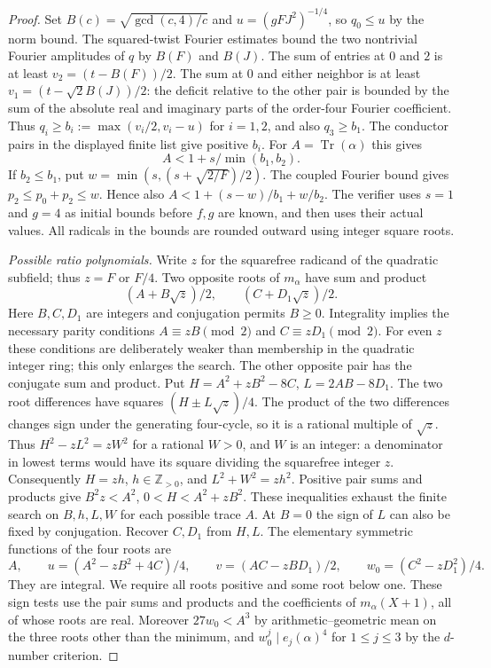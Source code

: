 \documentclass[11pt,a4paper]{article}
\numberwithin{equation}{section}
\begin{document}
\begin{proof}
Set $B(c)=\sqrt{\gcd(c,4)/c}$ and
$u=(gFJ^2)^{-1/4}$, so $q_0\le u$ by the norm bound.
The squared-twist Fourier estimates bound the two nontrivial Fourier
amplitudes of $q$ by $B(F)$ and $B(J)$.
The sum of entries at $0$ and $2$ is at least
$v_2=(t-B(F))/2$. The sum at $0$ and either neighbor is at least
$v_1=(t-\sqrt{2}B(J))/2$: the deficit relative to the other pair is
bounded by the sum of the absolute real and imaginary parts of the
order-four Fourier coefficient. Thus
$q_i\ge b_i:=\max(v_i/2,v_i-u)$ for $i=1,2$, and also $q_3\ge b_1$.
The conductor pairs in the displayed finite list give positive $b_i$.
For $A=\operatorname{Tr}(\alpha)$ this gives
\[
 A<1+s/\min(b_1,b_2).
\]
If $b_2\le b_1$, put $w=\min(s,(s+\sqrt{2/F})/2)$.
The coupled Fourier bound gives $p_2\le p_0+p_2\le w$.
Hence also $A<1+(s-w)/b_1+w/b_2$.
The verifier uses $s=1$ and $g=4$ as initial bounds before $f,g$ are
known, and then uses their actual values. All radicals in the bounds
are rounded outward using integer square roots.

\medskip\noindent\emph{Possible ratio polynomials.}
Write $z$ for the squarefree radicand of the quadratic subfield; thus
$z=F$ or $F/4$. Two opposite roots of $m_\alpha$ have sum and product
\[
 (A+B\sqrt z)/2,\qquad (C+D_1\sqrt z)/2.
\]
Here $B,C,D_1$ are integers and conjugation permits $B\ge0$.
Integrality implies the necessary parity conditions
$A\equiv zB\pmod2$ and $C\equiv zD_1\pmod2$.
For even $z$ these conditions are deliberately weaker than membership
in the quadratic integer ring; this only enlarges the search.
The other opposite pair has the conjugate sum and product.
Put $H=A^2+zB^2-8C$, $L=2AB-8D_1$. The two root differences have
squares $(H\pm L\sqrt z)/4$. The product of the two differences changes
sign under the generating four-cycle, so it is a rational multiple of
$\sqrt z$. Thus $H^2-zL^2=zW^2$ for a rational $W>0$, and $W$ is an
integer: a denominator in lowest terms would have its square dividing
the squarefree integer $z$. Consequently $H=zh$, $h\in\mathbb Z_{>0}$,
and $L^2+W^2=zh^2$. Positive pair sums and products give
$B^2z<A^2$, $0<H<A^2+zB^2$. These inequalities exhaust the finite
search on $B,h,L,W$ for each possible trace $A$. At $B=0$ the sign of
$L$ can also be fixed by conjugation. Recover $C,D_1$ from $H,L$.
The elementary symmetric functions of the four roots are
\[
 A,\qquad u=(A^2-zB^2+4C)/4,\qquad
 v=(AC-zBD_1)/2,\qquad w_0=(C^2-zD_1^2)/4 .
\]
They are integral. We require all roots positive and some root below one.
These sign tests use the pair sums and products and the coefficients of
$m_\alpha(X+1)$, all of whose roots are real.
Moreover $27w_0<A^3$ by arithmetic--geometric mean on the three roots
other than the minimum, and
$w_0^j\mid e_j(\alpha)^4$ for $1\le j\le3$ by the $d$-number criterion.


\end{proof}
\end{document}

